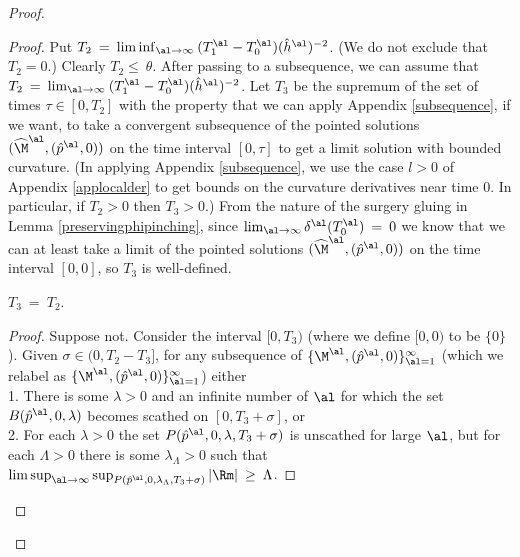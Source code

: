 \begin{proof}
\begin{proof}
Put $T_2 \: = \: \liminf_{\al \rightarrow \infty} \: (T_1^\al - T_0^\al)(\hat{h}^\al)^{-2}$. (We do
not exclude that $T_2 = 0$.) Clearly $T_2 \le \: \theta$.
After passing to a subsequence, we can assume that
$T_2 \: = \: \lim_{\al \rightarrow \infty} \: (T_1^\al - T_0^\al)(\hat{h}^\al)^{-2}$.
Let $T_3$ be the supremum of the set of times
$\tau \in [0, T_2]$ with the property that we can apply
Appendix \ref{subsequence}, if we want,
to take a convergent subsequence of the pointed solutions
$(\widehat{\M}^\al, (\hat{p}^\al,0))$ on the time interval $[0, \tau]$ to get
a limit solution with bounded curvature.
(In applying Appendix \ref{subsequence}, we use the case $l >0$ of
Appendix \ref{applocalder} to get bounds on the
curvature derivatives near time $0$. In particular, if
$T_2 > 0$ then $T_3 > 0$.)
From the nature of the
surgery gluing in Lemma \ref{preservingphipinching},
since $\lim_{\al \rightarrow \infty}
\delta^\al (T_0^\al) \: = \: 0$
we know that we can at least
take a limit of the pointed solutions
$(\widehat{\M}^\al, (\hat{p}^\al,0))$ on the time interval $[0,0]$,
so $T_3$ is well-defined.

\begin{lemma}
  \label{lem:kl-evolution-surgery-cap-ricci-flow-surgery-lemma}

$T_3 \: = \: T_2$.
\end{lemma}
\begin{proof}
Suppose not. Consider the interval $[0, T_3)$ (where we define
$[0, 0)$ to be $\{0\}$).
Given $\sigma \in (0, T_2 - T_3]$, for any subsequence
of $\{\M^\al, (\hat{p}^\al,0)\}_{\al=1}^\infty$ (which we relabel as
$\{\M^\al, (\hat{p}^\al,0)\}_{\al=1}^\infty$)
either \\
1. There is some $\lambda > 0$ and an
infinite number of $\al$
for which the set $B(\hat{p}^{\al}, 0, \lambda)$ becomes
scathed on $[0, T_3 + \sigma]$, or \\
2. For each $\lambda > 0$ the set
$P(\hat{p}^{\al}, 0, \lambda, T_3 + \sigma)$
is unscathed for large $\al$, but for each
$\Lambda > 0$ there is some
$\lambda_\Lambda > 0$ such that
$\limsup_{\al \rightarrow \infty}
\sup_{P(\hat{p}^{\al}, 0, \lambda_\Lambda, T_3 + \sigma)} |\Rm| \: \ge \: \Lambda$.


\end{proof}
\end{proof}
\end{proof}
